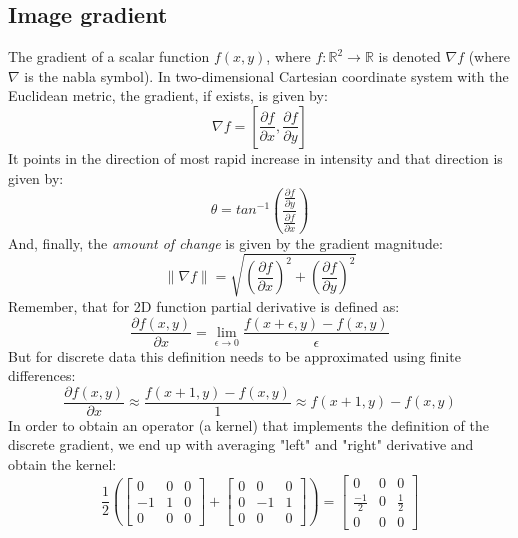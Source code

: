 \subsection{Image gradient}
The gradient of a scalar function $f(x, y)$, where $f: \mathbb{R}^2 \rightarrow \mathbb{R}$ is denoted $\nabla f$ (where $\nabla$ is the nabla symbol). In two-dimensional Cartesian coordinate system with the Euclidean metric, the gradient, if exists, is given by:
\begin{equation}
	\nabla f = [\frac{\partial f}{\partial x}, \frac{\partial f}{\partial y}]
\end{equation}
It points in the direction of most rapid increase in intensity and that direction is given by:
\begin{equation}
	\theta = tan^{-1}(\frac{\frac{\partial f}{\partial y}}{\frac{\partial f}{\partial x}})
\end{equation}
And, finally, the \textit{amount of change} is given by the gradient magnitude:
\begin{equation}
	\parallel \nabla f \parallel = \sqrt{(\frac{\partial f}{\partial x})^2 + (\frac{\partial f}{\partial y})^2}
\end{equation}
Remember, that for 2D function partial derivative is defined as:
\begin{equation}
	\frac{\partial f(x,y)}{\partial x} = \lim_{\epsilon \to 0} \frac{f(x + \epsilon, y) - f(x, y)}{\epsilon}
\end{equation}
But for discrete data this definition needs to be approximated using finite differences:
\begin{equation}
	\frac{\partial f(x,y)}{\partial x} \approx \frac{f(x + 1, y) - f(x, y)}{1} \approx f(x + 1, y) - f(x, y)
\end{equation}
In order to obtain an operator (a kernel) that implements the definition of the discrete gradient, we end up with averaging "left" and "right" derivative and obtain the kernel:
\[
\frac{1}{2}
(\begin{bmatrix}
    0 & 0 & 0 \\
    -1 & 1 & 0 \\
    0 & 0 & 0
\end{bmatrix}
+
\begin{bmatrix}
    0 & 0 & 0 \\
    0 & -1 & 1 \\
    0 & 0 & 0
\end{bmatrix})
=
\begin{bmatrix}
    0 & 0 & 0 \\
    \frac{-1}{2} & 0 & \frac{1}{2} \\
    0 & 0 & 0
\end{bmatrix}
\]

